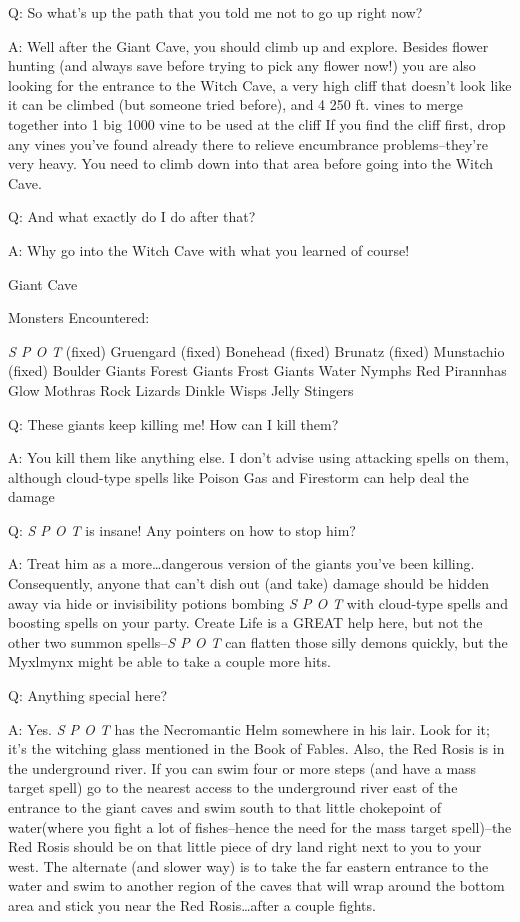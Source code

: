 \documentclass[12pt]{article}
\begin{document}
Q: So what's up the path that you told me not to go up right now?

A: Well after the Giant Cave, you should climb up and explore. Besides
flower hunting (and always save before trying to pick any flower now!)
you are also looking for the entrance to the Witch Cave, a very high
cliff that doesn't look like it can be climbed (but someone tried
before), and 4 250 ft. vines to merge together into 1 big 1000 vine to
be used at the cliff If you find the cliff first, drop any vines you've
found already there to relieve encumbrance problems--they're very heavy.
You need to climb down into that area before going into the Witch Cave.

Q: And what exactly do I do after that?

A: Why go into the Witch Cave with what you learned of course!

Giant Cave

Monsters Encountered:

\emph{S P O T} (fixed) Gruengard (fixed) Bonehead (fixed) Brunatz
(fixed) Munstachio (fixed) Boulder Giants Forest Giants Frost Giants
Water Nymphs Red Pirannhas Glow Mothras Rock Lizards Dinkle Wisps Jelly
Stingers

Q: These giants keep killing me! How can I kill them?

A: You kill them like anything else. I don't advise using attacking
spells on them, although cloud-type spells like Poison Gas and Firestorm
can help deal the damage

Q: \emph{S P O T} is insane! Any pointers on how to stop him?

A: Treat him as a more\ldots{}dangerous version of the giants you've
been killing. Consequently, anyone that can't dish out (and take) damage
should be hidden away via hide or invisibility potions bombing \emph{S P
O T} with cloud-type spells and boosting spells on your party. Create
Life is a GREAT help here, but not the other two summon spells--\emph{S
P O T} can flatten those silly demons quickly, but the Myxlmynx might be
able to take a couple more hits.

Q: Anything special here?

A: Yes. \emph{S P O T} has the Necromantic Helm somewhere in his lair.
Look for it; it's the witching glass mentioned in the Book of Fables.
Also, the Red Rosis is in the underground river. If you can swim four or
more steps (and have a mass target spell) go to the nearest access to
the underground river east of the entrance to the giant caves and swim
south to that little chokepoint of water(where you fight a lot of
fishes--hence the need for the mass target spell)--the Red Rosis should
be on that little piece of dry land right next to you to your west. The
alternate (and slower way) is to take the far eastern entrance to the
water and swim to another region of the caves that will wrap around the
bottom area and stick you near the Red Rosis\ldots{}after a couple
fights.
\end{document}
